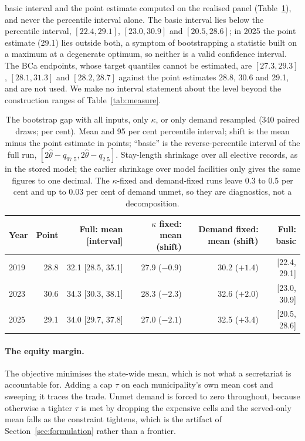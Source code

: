 basic interval and the point estimate computed on the realised panel (Table~\ref{tab:bootvar}), and never the
percentile interval alone. The basic interval lies below the percentile interval,
$[22.4, 29.1]$, $[23.0, 30.9]$ and $[20.5, 28.6]$; in 2025 the point estimate (29.1) lies outside both, a symptom of bootstrapping a statistic built on a maximum at a degenerate optimum, so neither is a valid confidence interval. The BCa endpoints, whose target quantiles cannot be estimated, are $[27.3, 29.3]$, $[28.1, 31.3]$ and $[28.2, 28.7]$ against the point estimates 28.8, 30.6 and 29.1, and are not used. We make no interval statement about the level beyond the construction ranges of Table~\ref{tab:measure}.

\begin{table}[t]
\centering
\caption{The bootstrap gap with all inputs, only $\kappa$, or only demand resampled (340 paired draws; per cent). Mean and 95 per cent percentile interval; shift is the mean minus the point estimate in points; ``basic'' is the reverse-percentile interval of the full run, $[2\hat\theta - q_{97.5}, 2\hat\theta - q_{2.5}]$. Stay-length shrinkage over all elective records, as in the stored model; the earlier shrinkage over model facilities only gives the same figures to one decimal. The $\kappa$-fixed and demand-fixed runs leave 0.3 to 0.5 per cent and up to 0.03 per cent of demand unmet, so they are diagnostics, not a decomposition.}
\label{tab:bootvar}
\begin{tabular}{lrrrrr}
\toprule
Year & Point & Full: mean [interval] & $\kappa$ fixed: mean (shift) & Demand fixed: mean (shift) & Full: basic \\
\midrule
2019 & 28.8 & 32.1 [28.5, 35.1] & 27.9 ($-0.9$) & 30.2 ($+1.4$) & [22.4, 29.1] \\
2023 & 30.6 & 34.3 [30.3, 38.1] & 28.3 ($-2.3$) & 32.6 ($+2.0$) & [23.0, 30.9] \\
2025 & 29.1 & 34.0 [29.7, 37.8] & 27.0 ($-2.1$) & 32.5 ($+3.4$) & [20.5, 28.6] \\
\bottomrule
\end{tabular}
\end{table}


\paragraph{The equity margin.} The objective minimises the state-wide mean, which
is not what a secretariat is accountable for. Adding a cap $\tau$ on each
municipality's own mean cost and sweeping it traces the trade. Unmet demand is
forced to zero throughout, because otherwise a tighter $\tau$ is met by dropping
the expensive cells and the served-only mean falls as the constraint tightens,
which is the artifact of Section~\ref{sec:formulation} rather than a frontier.

